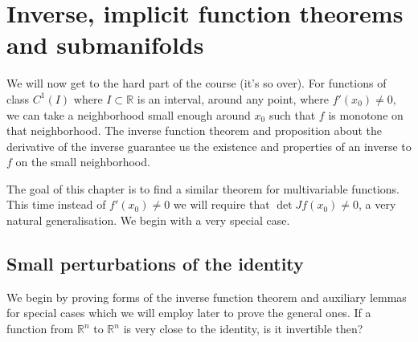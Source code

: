 
\chapter{Inverse, implicit function theorems and submanifolds}

We will now get to the hard part of the course (it's so over). For functions of class $C^{1}(I)$ where $I \subset \mathbb{R}$ is an interval, around any point, where $f'(x_{0}) \neq 0$, we can take a neighborhood small enough around $x_{0}$ such that $f$ is monotone on that neighborhood. The inverse function theorem and proposition about the derivative of the inverse guarantee us the existence and properties of an inverse to $f$ on the small neighborhood.

The goal of this chapter is to find a similar theorem for multivariable functions. This time instead of $f'(x_{0}) \neq 0$ we will require that $\det Jf(x_{0}) \neq 0$, a very natural generalisation. We begin with a very special case.

\section{Small perturbations of the identity}

We begin by proving forms of the inverse function theorem and auxiliary lemmas for special cases which we will employ later to prove the general ones. If a function from $\mathbb{R}^{n}$ to $\mathbb{R}^{n}$ is very close to the identity, is it invertible then?

